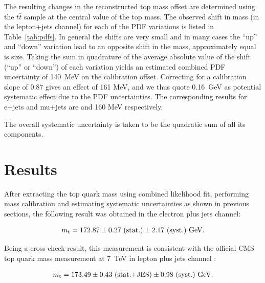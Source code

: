 \begin{description}[wide=\parindent]
The resulting changes in the reconstructed top mass offset are determined using the  $t \bar t$ sample at the central
value of the top mass. The observed shift in mass (in the lepton+jets channel) for each of the PDF variations is
listed in Table~\ref{tab:pdfs}. In general the shifts are very small and in many cases the ``up'' and ``down''
variation lead to an opposite shift in the mass, approximately equal is size. Taking the sum in quadrature of the
average absolute value of the shift (``up'' or ``down'') of each variation yields an estimated combined PDF
uncertainty of 140~MeV on the calibration offset. Correcting for a calibration slope of 0.87 gives an effect of 161
MeV, and we thus quote 0.16~GeV as potential systematic effect due to the PDF uncertainties. The corresponding results
for e+jets and mu+jets are and 160 MeV respectively.


\end{description}

The overall systematic uncertainty is taken to be the quadratic sum of all its components.


\section{Results}
\label{s_top_mass:results}
After extracting the top quark mass using combined likelihood fit, performing mass calibration and estimating systematic
uncertainties as shown in previous sections, the following result was obtained in the electron plus jets channel:

\begin{equation}
	m_\mathrm{t} = 172.87 \pm 0.27~\textrm{(stat.)} \pm 2.17~\textrm{(syst.)}~\textrm{GeV}.
	\label{final_result}
\end{equation}

Being a cross-check result, this measurement is consistent with the official CMS top quark mass measurement at
\SI{7}{\TeV} in lepton plus jets channel \autocite{top_mass_ljets_CMS}:

\begin{equation}
\begin{split}
	m_\mathrm{t} = 173.49 \pm 0.43~\textrm{(stat.+JES)} \pm 0.98~\textrm{(syst.)}~\textrm{GeV}.\\
	\label{final_result_official_ljets}
\end{split}
\end{equation}


